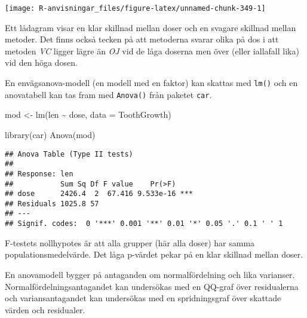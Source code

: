 \documentclass[
]{book}
\newenvironment{Shaded}{\begin{snugshade}}{\end{snugshade}}
\newcommand{\AttributeTok}[1]{\textcolor[rgb]{0.77,0.63,0.00}{#1}}
\newcommand{\FunctionTok}[1]{\textcolor[rgb]{0.00,0.00,0.00}{#1}}
\newcommand{\NormalTok}[1]{#1}
\newcommand{\OtherTok}[1]{\textcolor[rgb]{0.56,0.35,0.01}{#1}}
\newcommand{\SpecialCharTok}[1]{\textcolor[rgb]{0.00,0.00,0.00}{#1}}
\theoremstyle{definition}
\theoremstyle{definition}
\theoremstyle{definition}
\theoremstyle{definition}
\theoremstyle{remark}
\begin{document}
\begin{center}\texttt{[image: R-anvisningar\_files/figure-latex/unnamed-chunk-349-1]} \end{center}

Ett lådagram visar en klar skillnad mellan doser och en svagare skillnad mellan metoder. Det finns också tecken på att metoderna svarar olika på dos i att metoden \emph{VC} ligger lägre än \emph{OJ} vid de låga doserna men över (eller iallafall lika) vid den höga dosen.

En envägsanova-modell (en modell med en faktor) kan skattas med \texttt{lm()} och en anovatabell kan tas fram med \texttt{Anova()} från paketet \texttt{car}.

\begin{Shaded}
\begin{Highlighting}[]
\NormalTok{mod }\OtherTok{\textless{}{-}} \FunctionTok{lm}\NormalTok{(len }\SpecialCharTok{\textasciitilde{}}\NormalTok{ dose, }\AttributeTok{data =}\NormalTok{ ToothGrowth)}

\FunctionTok{library}\NormalTok{(car)}
\FunctionTok{Anova}\NormalTok{(mod)}
\end{Highlighting}
\end{Shaded}

\begin{verbatim}
## Anova Table (Type II tests)
## 
## Response: len
##           Sum Sq Df F value    Pr(>F)    
## dose      2426.4  2  67.416 9.533e-16 ***
## Residuals 1025.8 57                      
## ---
## Signif. codes:  0 '***' 0.001 '**' 0.01 '*' 0.05 '.' 0.1 ' ' 1
\end{verbatim}

F-testets nollhypotes är att alla grupper (här alla doser) har samma populationsmedelvärde. Det låga p-värdet pekar på en klar skillnad mellan doser.

En anovamodell bygger på antaganden om normalfördelning och lika varianser. Normalfördelningsantagandet kan undersökas med en QQ-graf över residualerna och variansantagandet kan undersökas med en spridningsgraf över skattade värden och residualer.
\end{document}
